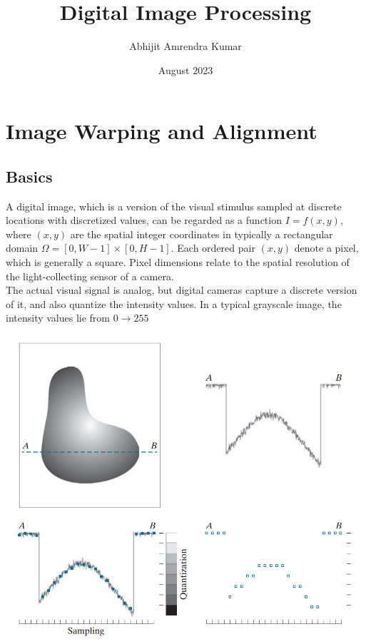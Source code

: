 \documentclass{report}
\title{Digital Image Processing}
\author{Abhijit Amrendra Kumar}
\date{August 2023}
\begin{document}
\maketitle

\chapter{Image Warping and Alignment}
\section{Basics}

\noindent A digital image, which is a version of the visual stimulus sampled at discrete locations with discretized values, can be regarded as a function $I = f(x,y)$, where $(x,y)$ are the spatial integer coordinates in typically a rectangular domain $\Omega = [0,W-1]\times[0,H-1]$. Each ordered pair $(x,y)$ denote a pixel, which is generally a square. Pixel dimensions relate to the spatial resolution of the light-collecting sensor of a camera. \\

\noindent The actual visual signal is analog, but digital cameras capture a discrete version of it, and also quantize the intensity values. In a typical grayscale image, the intensity values lie from $0\rightarrow 255$

\begin{center}
  \includegraphics[scale=0.5]{"images/dip-01.png"}
\end{center}
\end{document}
